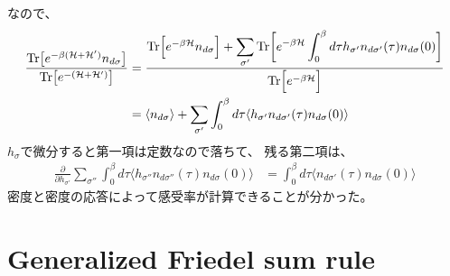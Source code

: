 \documentclass[a4j]{jarticle}
\begin{document}
なので、
\begin{align}
	\frac{
		{\rm Tr} \big[ e^{- \beta (\mathcal{H}+\mathcal{H}') } n_{d \sigma} \big]
	}{
		{\rm Tr} \big[ e^{- (\mathcal{H}+\mathcal{H}') } \big]
	}
	 & =
	\dfrac{
		{\rm Tr}
		\Big[
			e^{- \beta \mathcal{H} }
			n_{d \sigma}
			\Big]
		+
		\displaystyle \sum_{\sigma'}
		{\rm Tr}
		\bigg[
			e^{- \beta \mathcal{H} }
			\int^{\beta}_{0}d \tau
			h_{\sigma'}
			n_{d \sigma'}(\tau)
			n_{d \sigma}(0)
			\bigg]
	}{
		{\rm Tr}
		\Big[
			e^{- \beta \mathcal{H} }
			\Big]
	}
	\nonumber \\ &=
	\langle n_{d \sigma} \rangle
	+
	\sum_{\sigma'}
	\int^{\beta}_{0}d \tau
	\langle
	h_{\sigma'}
	n_{d \sigma'}(\tau)
	n_{d \sigma}(0)
	\rangle
\end{align}
$h_{\sigma}$で微分すると第一項は定数なので落ちて、
残る第二項は、
\begin{align}
	\frac{\partial}{\partial h_{\sigma'}}
	\sum_{\sigma''}
	\int^{\beta}_{0}d \tau
	\langle
	h_{\sigma''}
	n_{d \sigma''}(\tau)
	n_{d \sigma}(0)
	\rangle
	 & =
	\int^{\beta}_{0}d \tau
	\langle
	n_{d \sigma'}(\tau)
	n_{d \sigma}(0)
	\rangle
\end{align}
密度と密度の応答によって感受率が計算できることが分かった。

\section*{Generalized Friedel sum rule}
\end{document}
